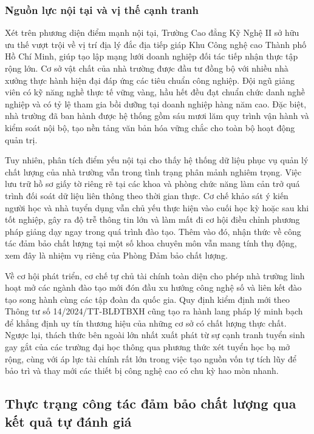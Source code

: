 \subsubsection{Nguồn lực nội tại và vị thế cạnh tranh}

Xét trên phương diện điểm mạnh nội tại, Trường Cao đẳng Kỹ Nghệ II sở hữu ưu thế vượt trội về vị trí địa lý đắc địa tiếp giáp Khu Công nghệ cao Thành phố Hồ Chí Minh, giúp tạo lập mạng lưới doanh nghiệp đối tác tiếp nhận thực tập rộng lớn. Cơ sở vật chất của nhà trường được đầu tư đồng bộ với nhiều nhà xưởng thực hành hiện đại đáp ứng các tiêu chuẩn công nghiệp. Đội ngũ giảng viên có kỹ năng nghề thực tế vững vàng, hầu hết đều đạt chuẩn chức danh nghề nghiệp và có tỷ lệ tham gia bồi dưỡng tại doanh nghiệp hàng năm cao. Đặc biệt, nhà trường đã ban hành được hệ thống gồm sáu mươi lăm quy trình vận hành và kiểm soát nội bộ, tạo nền tảng văn bản hóa vững chắc cho toàn bộ hoạt động quản trị.

Tuy nhiên, phân tích điểm yếu nội tại cho thấy hệ thống dữ liệu phục vụ quản lý chất lượng của nhà trường vẫn trong tình trạng phân mảnh nghiêm trọng. Việc lưu trữ hồ sơ giấy tờ riêng rẽ tại các khoa và phòng chức năng làm cản trở quá trình đối soát dữ liệu liên thông theo thời gian thực. Cơ chế khảo sát ý kiến người học và nhà tuyển dụng vẫn chủ yếu thực hiện vào cuối học kỳ hoặc sau khi tốt nghiệp, gây ra độ trễ thông tin lớn và làm mất đi cơ hội điều chỉnh phương pháp giảng dạy ngay trong quá trình đào tạo. Thêm vào đó, nhận thức về công tác đảm bảo chất lượng tại một số khoa chuyên môn vẫn mang tính thụ động, xem đây là nhiệm vụ riêng của Phòng Đảm bảo chất lượng.

Về cơ hội phát triển, cơ chế tự chủ tài chính toàn diện cho phép nhà trường linh hoạt mở các ngành đào tạo mới đón đầu xu hướng công nghệ số và liên kết đào tạo song hành cùng các tập đoàn đa quốc gia. Quy định kiểm định mới theo Thông tư số 14/2024/TT-BLĐTBXH cũng tạo ra hành lang pháp lý minh bạch để khẳng định uy tín thương hiệu của những cơ sở có chất lượng thực chất. Ngược lại, thách thức bên ngoài lớn nhất xuất phát từ sự cạnh tranh tuyển sinh gay gắt của các trường đại học thông qua phương thức xét tuyển học bạ mở rộng, cùng với áp lực tài chính rất lớn trong việc tạo nguồn vốn tự tích lũy để bảo trì và thay mới các thiết bị công nghệ cao có chu kỳ hao mòn nhanh.

\subsection{Thực trạng công tác đảm bảo chất lượng qua kết quả tự đánh giá}

